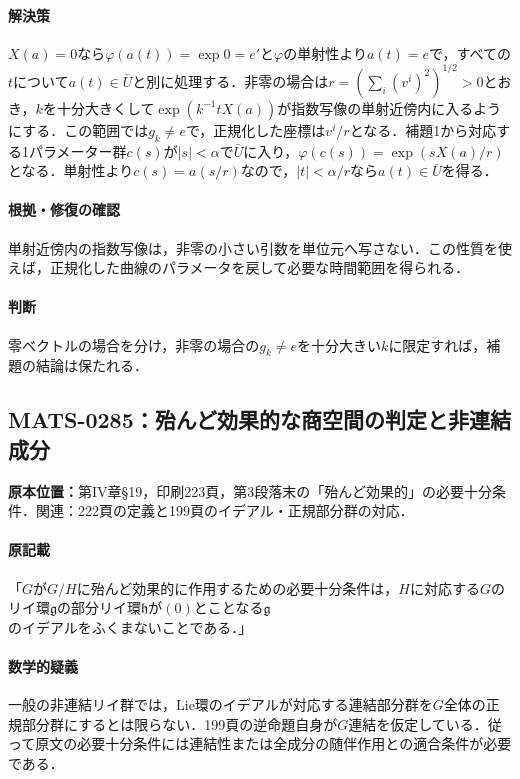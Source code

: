 \documentclass[a4paper,10pt]{ltjsarticle}
\begin{document}
\paragraph{解決策}$X(a)=0$なら$\varphi(a(t))=\exp0=e′$と$\varphi$の単射性より$a(t)=e$で，すべての$t$について$a(t)\in\bar U$と別に処理する．非零の場合は$r=(\sum_i(v^i)^2)^{1/2}>0$とおき，$k$を十分大きくして$\exp(k^{-1}tX(a))$が指数写像の単射近傍内に入るようにする．この範囲では$g_k\ne e$で，正規化した座標は$v^i/r$となる．補題1から対応する1パラメーター群$c(s)$が$|s|<\alpha$で$\bar U$に入り，$\varphi(c(s))=\exp(sX(a)/r)$となる．単射性より$c(s)=a(s/r)$なので，$|t|<\alpha/r$なら$a(t)\in\bar U$を得る．

\paragraph{根拠・修復の確認}単射近傍内の指数写像は，非零の小さい引数を単位元へ写さない．この性質を使えば，正規化した曲線のパラメータを戻して必要な時間範囲を得られる．

\paragraph{判断}零ベクトルの場合を分け，非零の場合の$g_k\ne e$を十分大きい$k$に限定すれば，補題の結論は保たれる．


\subsection*{MATS-0285：殆んど効果的な商空間の判定と非連結成分}\label{math:MATS-0285}
\noindent\textbf{原本位置：}第IV章\S19，印刷223頁，第3段落末の「殆んど効果的」の必要十分条件．関連：222頁の定義と199頁のイデアル・正規部分群の対応．

\paragraph{原記載}「$G$が$G/H$に殆んど効果的に作用するための必要十分条件は，$H$に対応する$G$のリイ環$\mathfrak g$の部分リイ環$\mathfrak h$が$(0)$とことなる$\mathfrak g$のイデアルをふくまないことである．」

\paragraph{数学的疑義}一般の非連結リイ群では，Lie環のイデアルが対応する連結部分群を$G$全体の正規部分群にするとは限らない．199頁の逆命題自身が$G$連結を仮定している．従って原文の必要十分条件には連結性または全成分の随伴作用との適合条件が必要である．
\end{document}
